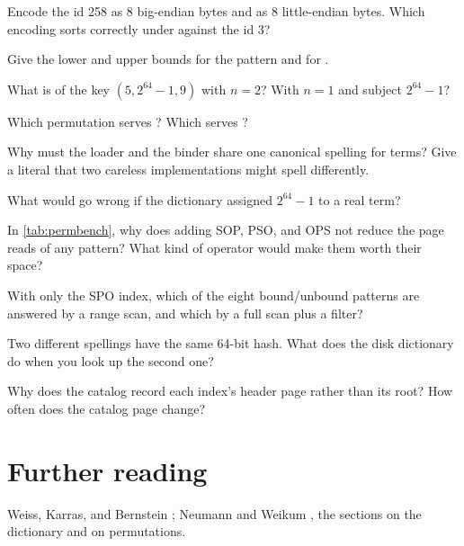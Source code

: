 \begin{checkyourself}
\item Encode the id 258 as 8 big-endian bytes and as 8 little-endian bytes. Which encoding sorts correctly under  against the id 3?
\item Give the lower and upper bounds for the pattern  and for .
\item What is  of the key $(5, 2^{64}-1, 9)$ with $n = 2$? With $n = 1$ and subject $2^{64}-1$?
\item Which permutation serves ? Which serves ?
\item Why must the loader and the binder share one canonical spelling for terms? Give a literal that two careless implementations might spell differently.
\item What would go wrong if the dictionary assigned $2^{64}-1$ to a real term?
\item In \cref{tab:permbench}, why does adding SOP, PSO, and OPS not reduce the page reads of any pattern? What kind of operator would make them worth their space?
\item With only the SPO index, which of the eight bound/unbound patterns are answered by a range scan, and which by a full scan plus a filter?
\item Two different spellings have the same 64-bit hash. What does the disk dictionary do when you look up the second one?
\item Why does the catalog record each index's header page rather than its root? How often does the catalog page change?
\end{checkyourself}

\section*{Further reading}
Weiss, Karras, and Bernstein \cite{hexastore}; Neumann and Weikum \cite{rdf3x},
the sections on the dictionary and on permutations.
